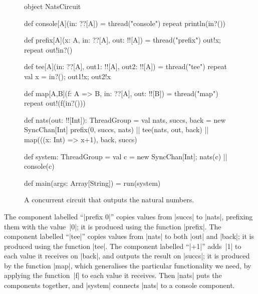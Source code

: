 \begin{center}
\end{center}


\begin{figure}
\begin{scala}
object NatsCircuit{
  def console[A](in: ??[A]) = thread("console"){ repeat{ println(in?()) } }

  def prefix[A](x: A, in: ??[A], out: !![A]) = thread("prefix"){
    out!x; repeat{ out!in?() }
  }

  def tee[A](in: ??[A], out1: !![A], out2: !![A]) = thread("tee"){
    repeat{ val x = in?(); out1!x; out2!x }
  }

  def map[A,B](f: A => B, in: ??[A], out: !![B]) = thread("map"){
    repeat{ out!(f(in?())) }
  }

  def nats(out: !![Int]): ThreadGroup = {
    val nats, succs, back = new SyncChan[Int]
    prefix(0, succs, nats) || tee(nats, out, back) ||
      map(((x: Int) => x+1), back, succs)
  }

  def system: ThreadGroup = {
    val c = new SyncChan[Int]; nats(c) || console(c)
  }

  def main(args: Array[String]) = run(system)
}
\end{scala}
\caption{A concurrent circuit that outputs the natural numbers.}
\label{fig:NatsCircuit}
\end{figure}

The component labelled ``|prefix 0|'' copies values from |succs| to |nats|,
prefixing them with the value~|0|; it is produced using the function |prefix|.
The component labelled ``|tee|'' copies values from |nats| to both |out| and
|back|; it is produced using the function |tee|.  The component labelled
``|+1|'' adds~|1| to each value it receives on |back|, and outputs the result
on |succs|; it is produced by the function |map|, which generalises the
particular functionality we need, by applying the function~|f| to each value
it receives.  Then |nats| puts the components together, and |system| connects
|nats| to a console component.

